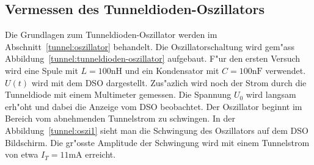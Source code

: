 \begin{refsection}


\section{Vermessen des Tunneldioden-Oszillators}

Die Grundlagen zum Tunneldioden-Oszillator werden im Abschnitt~\ref{tunnel:oszillator} behandelt. 
Die Oszillatorschaltung wird gem"ass Abbildung~\ref{tunnel:tunneldioden-oszillator} aufgebaut. 
F"ur den ersten Versuch wird eine Spule mit $L=100\text{nH}$ und ein Kondensator mit $C=100\text{nF}$ verwendet. 
$U(t)$ wird mit dem DSO dargestellt. 
Zus"azlich wird noch der Strom durch die Tunneldiode mit einem Multimeter gemessen. 
Die Spannung $U_0$ wird langsam erh"oht und dabei die Anzeige vom DSO beobachtet. 
Der Oszillator beginnt im Bereich vom abnehmenden Tunnelstrom zu schwingen. 
In der Abbildung~\ref{tunnel:oszi1} sieht man die Schwingung des Oszillators auf dem DSO Bildschirm. 
Die gr"osste Amplitude der Schwingung wird mit einem Tunnelstrom von etwa $I_T = 11\text{mA}$ erreicht.


\end{refsection}

